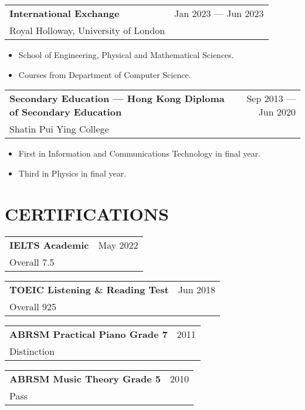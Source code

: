 \documentclass{article}
\makeatletter
\newcommand{\jobTitle}[3]{
    \vspace{0.3cm}
    \begin{tabular*}{1\textwidth}{||l@{\extracolsep{\fill}}r}
        \textbf{#1} & #2\\
        #3 &
    \end{tabular*}
}
\makeatother
\begin{document}
\jobTitle
{International Exchange}
{Jan 2023 --- Jun 2023}
{Royal Holloway, University of London}
\begin{itemize}[leftmargin=1.2cm]
    \item School of Engineering, Physical and Mathematical Sciences.
    \item Courses from Department of Computer Science.
\end{itemize}

\jobTitle
{Secondary Education --- Hong Kong Diploma of Secondary Education}
{Sep 2013 --- Jun 2020}
{Shatin Pui Ying College}
\begin{itemize}[leftmargin=1.2cm]
    \item First in Information and Communications Technology in final year.
    \item Third in Physics in final year.
\end{itemize}

\section{CERTIFICATIONS}

\jobTitle
{IELTS Academic}
{May 2022}
{Overall 7.5}

\jobTitle
{TOEIC Listening \& Reading Test}
{Jun 2018}
{Overall 925}

\jobTitle
{ABRSM Practical Piano Grade 7}
{2011}
{Distinction}

\jobTitle
{ABRSM Music Theory Grade 5}
{2010}
{Pass}
\end{document}
